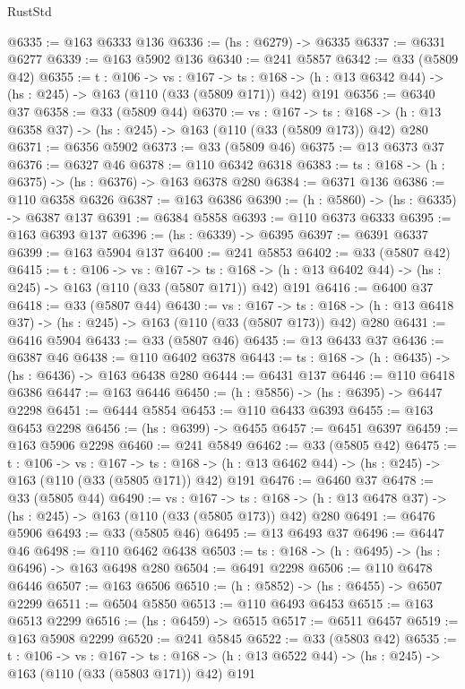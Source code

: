 \begin{lexlean}{RustStd}
\begin{coremodule}
@6335 := @163 @6333 @136
@6336 := (hs : @6279) -> @6335
@6337 := @6331 @6277
@6339 := @163 @5902 @136
@6340 := @241 @5857
@6342 := @33 (@5809 @42)
@6355 := {t : @106} ->
  {vs : @167} ->
  {ts : @168} -> (h : @13 @6342 @44) -> (hs : @245) -> @163 (@110 (@33 (@5809 @171)) @42) @191
@6356 := @6340 @37
@6358 := @33 (@5809 @44)
@6370 := {vs : @167} ->
  {ts : @168} -> (h : @13 @6358 @37) -> (hs : @245) -> @163 (@110 (@33 (@5809 @173)) @42) @280
@6371 := @6356 @5902
@6373 := @33 (@5809 @46)
@6375 := @13 @6373 @37
@6376 := @6327 @46
@6378 := @110 @6342 @6318
@6383 := {ts : @168} -> (h : @6375) -> (hs : @6376) -> @163 @6378 @280
@6384 := @6371 @136
@6386 := @110 @6358 @6326
@6387 := @163 @6386
@6390 := (h : @5860) -> (hs : @6335) -> @6387 @137
@6391 := @6384 @5858
@6393 := @110 @6373 @6333
@6395 := @163 @6393 @137
@6396 := (hs : @6339) -> @6395
@6397 := @6391 @6337
@6399 := @163 @5904 @137
@6400 := @241 @5853
@6402 := @33 (@5807 @42)
@6415 := {t : @106} ->
  {vs : @167} ->
  {ts : @168} -> (h : @13 @6402 @44) -> (hs : @245) -> @163 (@110 (@33 (@5807 @171)) @42) @191
@6416 := @6400 @37
@6418 := @33 (@5807 @44)
@6430 := {vs : @167} ->
  {ts : @168} -> (h : @13 @6418 @37) -> (hs : @245) -> @163 (@110 (@33 (@5807 @173)) @42) @280
@6431 := @6416 @5904
@6433 := @33 (@5807 @46)
@6435 := @13 @6433 @37
@6436 := @6387 @46
@6438 := @110 @6402 @6378
@6443 := {ts : @168} -> (h : @6435) -> (hs : @6436) -> @163 @6438 @280
@6444 := @6431 @137
@6446 := @110 @6418 @6386
@6447 := @163 @6446
@6450 := (h : @5856) -> (hs : @6395) -> @6447 @2298
@6451 := @6444 @5854
@6453 := @110 @6433 @6393
@6455 := @163 @6453 @2298
@6456 := (hs : @6399) -> @6455
@6457 := @6451 @6397
@6459 := @163 @5906 @2298
@6460 := @241 @5849
@6462 := @33 (@5805 @42)
@6475 := {t : @106} ->
  {vs : @167} ->
  {ts : @168} -> (h : @13 @6462 @44) -> (hs : @245) -> @163 (@110 (@33 (@5805 @171)) @42) @191
@6476 := @6460 @37
@6478 := @33 (@5805 @44)
@6490 := {vs : @167} ->
  {ts : @168} -> (h : @13 @6478 @37) -> (hs : @245) -> @163 (@110 (@33 (@5805 @173)) @42) @280
@6491 := @6476 @5906
@6493 := @33 (@5805 @46)
@6495 := @13 @6493 @37
@6496 := @6447 @46
@6498 := @110 @6462 @6438
@6503 := {ts : @168} -> (h : @6495) -> (hs : @6496) -> @163 @6498 @280
@6504 := @6491 @2298
@6506 := @110 @6478 @6446
@6507 := @163 @6506
@6510 := (h : @5852) -> (hs : @6455) -> @6507 @2299
@6511 := @6504 @5850
@6513 := @110 @6493 @6453
@6515 := @163 @6513 @2299
@6516 := (hs : @6459) -> @6515
@6517 := @6511 @6457
@6519 := @163 @5908 @2299
@6520 := @241 @5845
@6522 := @33 (@5803 @42)
@6535 := {t : @106} ->
  {vs : @167} ->
  {ts : @168} -> (h : @13 @6522 @44) -> (hs : @245) -> @163 (@110 (@33 (@5803 @171)) @42) @191

\end{coremodule}
\end{lexlean}
